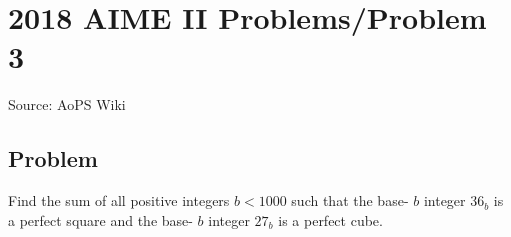 \documentclass[12pt]{article}
\begin{document}
\section*{{2018 AIME II Problems/Problem 3}}
Source: AoPS Wiki

\subsection*{Problem}
Find the sum of all positive integers $b < 1000$ such that the base- $b$ integer $36_{b}$ is a perfect square and the base- $b$ integer $27_{b}$ is a perfect cube.
\end{document}
